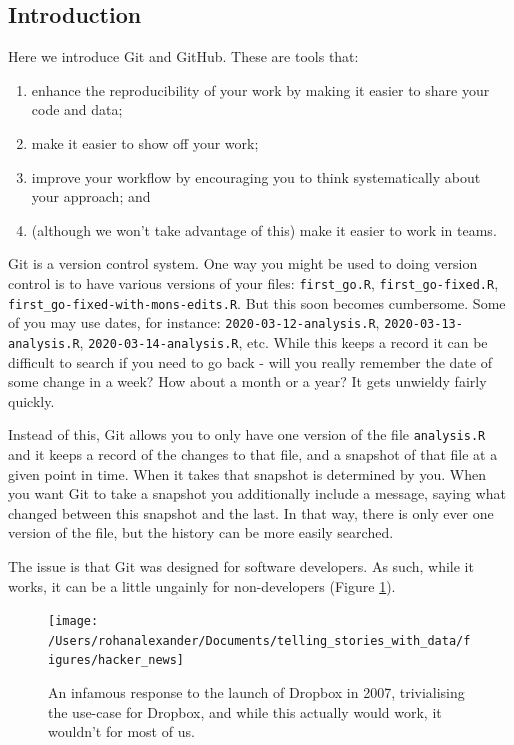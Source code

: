 \documentclass[
]{book}
\providecommand{\tightlist}{%
  \setlength{\itemsep}{0pt}\setlength{\parskip}{0pt}}
\begin{document}
\hypertarget{introduction-2}{%
\subsection{Introduction}\label{introduction-2}}

Here we introduce Git and GitHub. These are tools that:

\begin{enumerate}
\def\labelenumi{\alph{enumi}.}
\tightlist
\item
  enhance the reproducibility of your work by making it easier to share your code and data;
\item
  make it easier to show off your work;
\item
  improve your workflow by encouraging you to think systematically about your approach; and
\item
  (although we won't take advantage of this) make it easier to work in teams.
\end{enumerate}

Git is a version control system. One way you might be used to doing version control is to have various versions of your files: \texttt{first\_go.R}, \texttt{first\_go-fixed.R}, \texttt{first\_go-fixed-with-mons-edits.R}. But this soon becomes cumbersome. Some of you may use dates, for instance: \texttt{2020-03-12-analysis.R}, \texttt{2020-03-13-analysis.R}, \texttt{2020-03-14-analysis.R}, etc. While this keeps a record it can be difficult to search if you need to go back - will you really remember the date of some change in a week? How about a month or a year? It gets unwieldy fairly quickly.

Instead of this, Git allows you to only have one version of the file \texttt{analysis.R} and it keeps a record of the changes to that file, and a snapshot of that file at a given point in time. When it takes that snapshot is determined by you. When you want Git to take a snapshot you additionally include a message, saying what changed between this snapshot and the last. In that way, there is only ever one version of the file, but the history can be more easily searched.

The issue is that Git was designed for software developers. As such, while it works, it can be a little ungainly for non-developers (Figure \ref{fig:hackernews}).

\begin{figure}
\texttt{[image: /Users/rohanalexander/Documents/telling\_stories\_with\_data/figures/hacker\_news]} \caption{An infamous response to the launch of Dropbox in 2007, trivialising the use-case for Dropbox, and while this actually would work, it wouldn't for most of us.}\label{fig:hackernews}
\end{figure}
\end{document}

